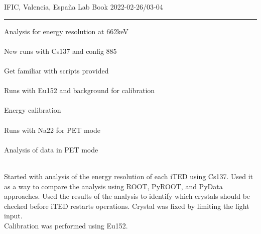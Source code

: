 \begin{center}
  {\Large IFIC, Valencia, España} \hfill {\Large Lab Book} \hfill {\Large 2022-02-26/03-04}\\
  \rule{\textwidth}{1pt}
\end{center}

\begin{minipage}[t][0.45\textheight][t]{0.97\linewidth}
  \begin{minipage}[t]{0.49\textwidth}
    \hspace{10pt}Analysis for energy resolution at 662keV\\~\\
    \hspace{10pt}New runs with Cs137 and config 885\\~\\
    \hspace{10pt}Get familiar with scripts provided\\~\\
    \hspace{10pt}Runs with Eu152 and background for calibration\\~\\
    \hspace{10pt}Energy calibration\\~\\
    \hspace{10pt}Runs with Na22 for PET mode\\~\\
    \hspace{10pt}Analysis of data in PET mode\\~\\
  \end{minipage}
  \begin{minipage}[t]{0.49\textwidth}
    \begin{minipage}[t][0.22\textheight][t]{\textwidth}
        Started with analysis of the energy resolution of each iTED using Cs137. Used it as a way to compare the analysis using ROOT, PyROOT, and PyData approaches. Used the results of the analysis to identify which crystals should be checked before iTED restarts operations. Crystal was fixed by limiting the light input.\\
        Calibration was performed using Eu152.
    \end{minipage}
    \begin{minipage}[t][0.22\textheight][t]{\textwidth}
    \end{minipage}
  \end{minipage}  
\end{minipage}

